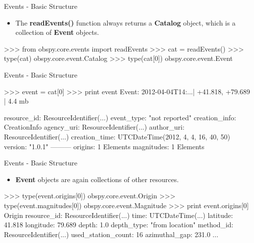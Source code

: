 \begin{frame}{Events - Basic Structure}
    \begin{itemize}
        \item The \textbf{readEvents()} function always returns a
            \textbf{Catalog} object, which is a collection of \textbf{Event}
            objects.
    \end{itemize}
\begin{myColorBox}{0.95}{}
\begin{python}
>>> from obspy.core.events import readEvents
>>> cat = readEvents()
>>> type(cat)
obspy.core.event.Catalog
>>> type(cat[0])
obspy.core.event.Event
\end{python}
\end{myColorBox}
\end{frame}

\begin{frame}{Events - Basic Structure}
\begin{myColorBox}{0.95}{}
\begin{python}
>>> event = cat[0]
>>> print event
Event:  2012-04-04T14:...| +41.818,  +79.689 | 4.4 mb

           resource_id: ResourceIdentifier(...)
            event_type: "not reported"
         creation_info: CreationInfo
            agency_uri: ResourceIdentifier(...)
            author_uri: ResourceIdentifier(...)
         creation_time: UTCDateTime(2012, 4, 4, 16, 40, 50)
               version: "1.0.1"
        ---------
                    origins: 1 Elements
                 magnitudes: 1 Elements
\end{python}
\end{myColorBox}
\end{frame}

\begin{frame}{Events - Basic Structure}
    \begin{itemize}
        \item \textbf{Event} objects are again collections of other resources.
    \end{itemize}
\begin{myColorBox}{0.95}{}
\begin{python}
>>> type(event.origins[0])
obspy.core.event.Origin
>>> type(event.magnitudes[0])
obspy.core.event.Magnitude
>>> print event.origins[0]
Origin
         resource_id: ResourceIdentifier(...)
                time: UTCDateTime(...)
            latitude: 41.818
           longitude: 79.689
               depth: 1.0
          depth_type: "from location"
           method_id: ResourceIdentifier(...)
  used_station_count: 16
       azimuthal_gap: 231.0
       ...
\end{python}
\end{myColorBox}
\end{frame}

